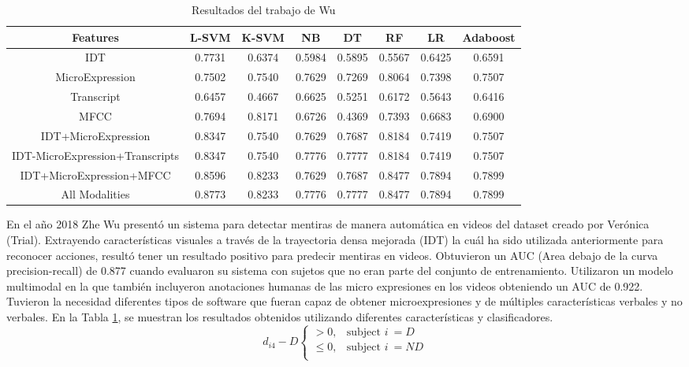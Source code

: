 \begin{onehalfspacing}
\begin{table}[h!]
\centering
    \begin{tabular}{|c|c|c|c|c|c|c|c|}
        \hline 
        Features & L-SVM & K-SVM & NB & DT & RF & LR & Adaboost\tabularnewline
        \hline 
        \hline 
        IDT & 0.7731 & 0.6374 & 0.5984 & 0.5895 & 0.5567 & 0.6425 & 0.6591\tabularnewline
        \hline 
        MicroExpression & 0.7502 & 0.7540 & 0.7629 & 0.7269 & 0.8064 & 0.7398 & 0.7507\tabularnewline
        \hline 
        Transcript & 0.6457 & 0.4667 & 0.6625 & 0.5251 & 0.6172 & 0.5643 & 0.6416\tabularnewline
        \hline 
        MFCC & 0.7694 & 0.8171 & 0.6726 & 0.4369 & 0.7393 & 0.6683 & 0.6900\tabularnewline
        \hline 
        IDT+MicroExpression & 0.8347 & 0.7540 & 0.7629 & 0.7687 & 0.8184 & 0.7419 & 0.7507\tabularnewline
        \hline 
        IDT-MicroExpression+Transcripts & 0.8347 & 0.7540 & 0.7776 & 0.7777 & 0.8184 & 0.7419 & 0.7507\tabularnewline
        \hline 
        IDT+MicroExpression+MFCC & 0.8596 & 0.8233 & 0.7629 & 0.7687 & 0.8477 & 0.7894 & 0.7899\tabularnewline
        \hline 
        All Modalities & 0.8773 & 0.8233 & 0.7776 & 0.7777 & 0.8477 & 0.7894 & 0.7899\tabularnewline
        \hline 
    \end{tabular}
	\caption{\footnotesize Resultados del trabajo de Wu}
	\label{tab:Fig_Wu_2017}
\end{table}


En el año 2018 Zhe Wu presentó un sistema para detectar mentiras de manera automática en videos del dataset creado por Verónica (Trial). Extrayendo características visuales a través de la trayectoria densa mejorada (IDT) la cuál ha sido utilizada anteriormente para reconocer acciones, resultó tener un resultado positivo para predecir mentiras en videos. Obtuvieron un AUC (Area debajo de la curva precision-recall) de 0.877 cuando evaluaron su sistema con sujetos que no eran parte del conjunto de entrenamiento. Utilizaron un modelo multimodal en la que también incluyeron anotaciones humanas de las micro expresiones en los videos obteniendo un AUC de 0.922. Tuvieron la necesidad diferentes tipos de software que fueran capaz de obtener microexpresiones y de múltiples características verbales y no verbales. En la Tabla \ref{tab:Fig_Wu_2017}, se muestran los resultados obtenidos utilizando diferentes características y clasificadores.\\

\begin{equation}
        d_{i4} - D 
    \begin{cases}
        > 0,& \text{subject  } i \ = D\\
        \le 0,& \text{subject } i \ = ND\\
    \end{cases}
    \label{fig:Figura_Tsiamyrtzis}
\end{equation}


\end{onehalfspacing}

